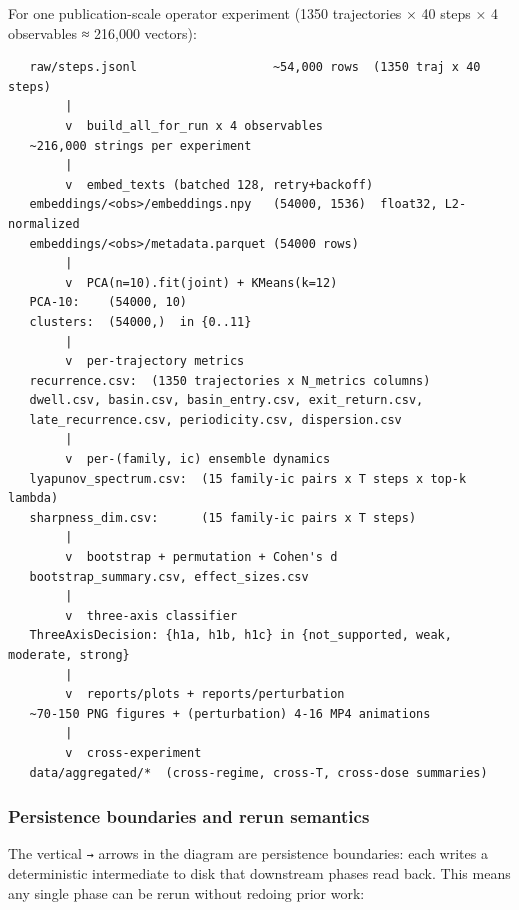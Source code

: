 \documentclass{article}
\theoremstyle{plain}
\theoremstyle{definition}
\begin{document}
For one publication-scale operator experiment (1350 trajectories ×
40 steps × 4 observables ≈ 216,000 vectors):

\begin{verbatim}
   raw/steps.jsonl                   ~54,000 rows  (1350 traj x 40 steps)
        |
        v  build_all_for_run x 4 observables
   ~216,000 strings per experiment
        |
        v  embed_texts (batched 128, retry+backoff)
   embeddings/<obs>/embeddings.npy   (54000, 1536)  float32, L2-normalized
   embeddings/<obs>/metadata.parquet (54000 rows)
        |
        v  PCA(n=10).fit(joint) + KMeans(k=12)
   PCA-10:    (54000, 10)
   clusters:  (54000,)  in {0..11}
        |
        v  per-trajectory metrics
   recurrence.csv:  (1350 trajectories x N_metrics columns)
   dwell.csv, basin.csv, basin_entry.csv, exit_return.csv,
   late_recurrence.csv, periodicity.csv, dispersion.csv
        |
        v  per-(family, ic) ensemble dynamics
   lyapunov_spectrum.csv:  (15 family-ic pairs x T steps x top-k lambda)
   sharpness_dim.csv:      (15 family-ic pairs x T steps)
        |
        v  bootstrap + permutation + Cohen's d
   bootstrap_summary.csv, effect_sizes.csv
        |
        v  three-axis classifier
   ThreeAxisDecision: {h1a, h1b, h1c} in {not_supported, weak, moderate, strong}
        |
        v  reports/plots + reports/perturbation
   ~70-150 PNG figures + (perturbation) 4-16 MP4 animations
        |
        v  cross-experiment
   data/aggregated/*  (cross-regime, cross-T, cross-dose summaries)
\end{verbatim}

\subsubsection{Persistence boundaries and rerun semantics}

The vertical \texttt{→} arrows in the diagram are persistence boundaries:
each writes a deterministic intermediate to disk that downstream phases
read back. This means any single phase can be rerun without redoing
prior work:
\end{document}
